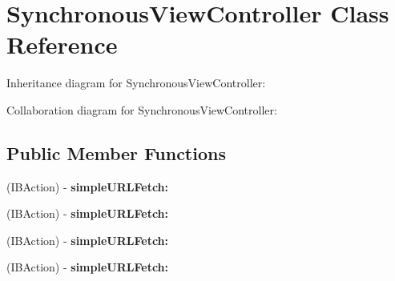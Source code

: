 \hypertarget{interface_synchronous_view_controller}{
\section{\-Synchronous\-View\-Controller \-Class \-Reference}
\label{interface_synchronous_view_controller}
}


\-Inheritance diagram for \-Synchronous\-View\-Controller\-:


\-Collaboration diagram for \-Synchronous\-View\-Controller\-:
\subsection*{\-Public \-Member \-Functions}
\begin{DoxyCompactItemize}
\item 
\hypertarget{interface_synchronous_view_controller_a1c123849c78c683ca61edf9c846e2e80}{
(\-I\-B\-Action) -\/ {\bfseries simple\-U\-R\-L\-Fetch\-:}}
\label{interface_synchronous_view_controller_a1c123849c78c683ca61edf9c846e2e80}

\item 
\hypertarget{interface_synchronous_view_controller_a1c123849c78c683ca61edf9c846e2e80}{
(\-I\-B\-Action) -\/ {\bfseries simple\-U\-R\-L\-Fetch\-:}}
\label{interface_synchronous_view_controller_a1c123849c78c683ca61edf9c846e2e80}

\item 
\hypertarget{interface_synchronous_view_controller_a1c123849c78c683ca61edf9c846e2e80}{
(\-I\-B\-Action) -\/ {\bfseries simple\-U\-R\-L\-Fetch\-:}}
\label{interface_synchronous_view_controller_a1c123849c78c683ca61edf9c846e2e80}

\item 
\hypertarget{interface_synchronous_view_controller_a1c123849c78c683ca61edf9c846e2e80}{
(\-I\-B\-Action) -\/ {\bfseries simple\-U\-R\-L\-Fetch\-:}}
\label{interface_synchronous_view_controller_a1c123849c78c683ca61edf9c846e2e80}

\end{DoxyCompactItemize}
